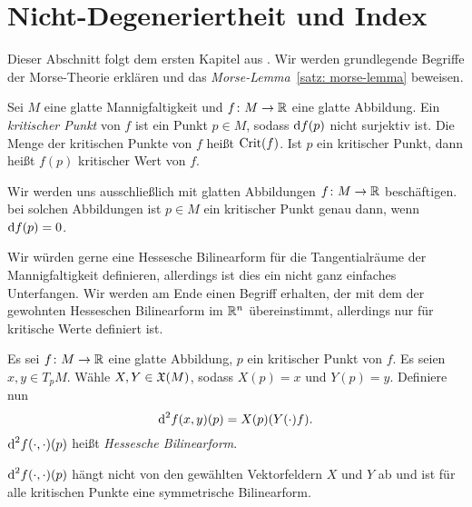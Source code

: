 \section{Nicht-Degeneriertheit und Index}

Dieser Abschnitt folgt dem ersten Kapitel aus \cite{milnor}. Wir werden grundlegende Begriffe der
Morse-Theorie erklären und das \textit{Morse-Lemma}~\ref{satz: morse-lemma} beweisen.

\begin{definition}
    \label{def: kritischer Punkt}
    Sei $M$ eine glatte Mannigfaltigkeit und $f \colon M \to { \mathbb R }$ eine glatte Abbildung. 
    Ein \textit{kritischer Punkt} von $f$ ist ein Punkt $p \in M$, sodass ${ \operatorname{d} } f (p)$ nicht 
    surjektiv ist.
    Die Menge der kritischen Punkte von $f$ heißt ${ \operatorname{Crit} } (f)$. Ist $p$ ein kritischer Punkt, dann
    heißt $f(p)$ kritischer Wert von $f$.
\end{definition}

\begin{remark}
    Wir werden uns ausschließlich mit glatten Abbildungen $f \colon M \to { \mathbb R }$ beschäftigen.
    bei solchen Abbildungen ist $p \in M$ ein kritischer Punkt genau dann, wenn 
    ${ \operatorname{d} } f (p) = 0$.
\end{remark}

Wir würden gerne eine Hessesche Bilinearform für die Tangentialräume der Mannigfaltigkeit
definieren, allerdings ist dies ein nicht ganz einfaches Unterfangen. Wir werden am Ende
einen Begriff erhalten, der mit dem der gewohnten Hesseschen Bilinearform im ${ \mathbb R }^n$
übereinstimmt, allerdings nur für kritische Werte definiert ist.

\begin{definition}
    Es sei $f \colon M \to { \mathbb R }$ eine glatte Abbildung, $p$ ein kritischer Punkt von $f$.
    Es seien $x, y \in T_pM$. Wähle $X, Y \in { \mathfrak{X} } (M)$, sodass $X(p) = x$ und 
    $Y(p) = y$. Definiere nun
    \[ { \operatorname{d} }^2 f (x, y) (p) = X(p)(Y(\cdot)f). \]
    ${ \operatorname{d} }^2 f (\cdot, \cdot) (p)$ heißt \textit{Hessesche Bilinearform}. 
\end{definition}

\begin{prop}
    \label{prop: hessesche ist sym bilinearform}
    ${ \operatorname{d} }^2 f (\cdot, \cdot) (p)$ hängt nicht von den gewählten Vektorfeldern $X$ und $Y$ ab 
    und ist für alle kritischen Punkte eine symmetrische Bilinearform.
\end{prop}


